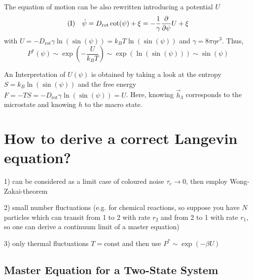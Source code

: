 \documentclass{notebook}
\begin{document}
The equation of motion can be also rewritten introducing a potential $U$
%
\begin{equation}
\mathrm{(I)} \quad \dot{\psi} = D_{\mathrm{rot}} \cot(\psi) + \xi = - \frac{1}{\gamma} \pdv{\psi} U + \xi
\end{equation}
%
with $U = -  D_{\mathrm{rot}} \gamma \ln(\sin(\psi)) = k_B T \ln(\sin(\psi))$ and $\gamma = 8 \pi \eta r^3$. Thus,
%
\begin{equation}
P^*(\psi) \sim \exp(-\frac{U}{k_B T}) \sim \exp(\ln(\sin(\psi))) \sim \sin(\psi)
\end{equation}
%

An Interpretation of $U(\psi)$ is obtained by taking a look at the entropy $S = k_B \ln(\sin(\psi))$ and the free energy $F = -T S = - D_{\mathrm{rot}} \gamma \ln(\sin(\psi)) = U$. Here, knowing $\vec{h}_3$ corresponds to the microstate and knowing $h$ to the macro state.

\section{How to derive a correct Langevin equation?}

1) can be considered as a limit case of coloured noise $\tau_c \to 0$, then employ Wong-Zakai-theorem

2) small number fluctuations (e.g. for chemical reactions, so suppose you have $N$ particles which can transit from 1 to 2 with rate $r_2$ and from 2 to 1 with rate $r_1$, so one can derive a continuum limit of a master equation)

3) only thermal fluctuations $T = \mathrm{const}$ and then use $P^* \sim \exp(- \beta U)$

\subsection*{Master Equation for a Two-State System}
\end{document}
